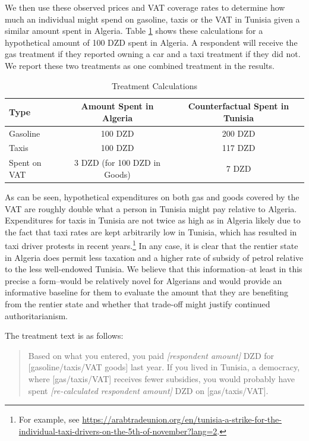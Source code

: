 \documentclass[12pt, letterpaper]{article}
\begin{document}
We then use these observed prices and VAT coverage rates to determine how much an individual might spend on gasoline, taxis or the VAT in Tunisia given a similar amount spent in Algeria. Table \ref{calc} shows these calculations for a hypothetical amount of 100 DZD spent in Algeria. A respondent will receive the gas treatment if they reported owning a car and a taxi treatment if they did not. We report these two treatments as one combined treatment in the results.

\begin{table}[H]
\caption{Treatment Calculations}\label{calc} 
\begin{tabular}{@{}lcc@{}}
\toprule 
Type         & Amount Spent in Algeria       & Counterfactual Spent in Tunisia \\ \midrule
Gasoline     & 100 DZD                       & 200 DZD                         \\
Taxis        & 100 DZD                       & 117 DZD                         \\
Spent on VAT & 3 DZD (for 100 DZD in Goods) & 7 DZD                       \\ \bottomrule
\end{tabular}
\end{table}

As can be seen, hypothetical expenditures on both gas and goods covered by the VAT are roughly double what a person in Tunisia might pay relative to Algeria. Expenditures for taxis in Tunisia are not twice as high as in Algeria likely due to the fact that taxi rates are kept arbitrarily low in Tunisia, which has resulted in taxi driver protests in recent years.\footnote{For example, see \url{https://arabtradeunion.org/en/tunisia-a-strike-for-the-individual-taxi-drivers-on-the-5th-of-november?lang=2}.} In any case, it is clear that the rentier state in Algeria does permit less taxation and a higher rate of subsidy of petrol relative to the less well-endowed Tunisia. We believe that this information--at least in this precise a form--would be relatively novel for Algerians and would provide an informative baseline for them to evaluate the amount that they are benefiting from the rentier state and whether that trade-off might justify continued authoritarianism. 

The treatment text is as follows:

\begin{quotation}
Based on what you entered, you paid \emph{[respondent amount]} DZD for [gasoline/taxis/VAT goods] last year. If you lived in Tunisia, a democracy, where [gas/taxis/VAT] receives fewer subsidies, you would probably have spent \emph{[re-calculated respondent amount]} DZD on [gas/taxis/VAT].
\end{quotation}
\end{document}
